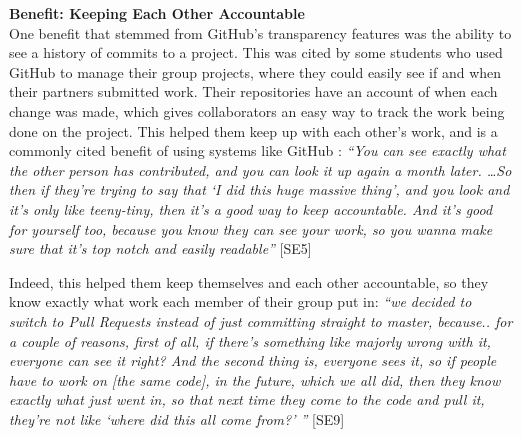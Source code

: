 


\textbf{Benefit: Keeping Each Other Accountable} \\
One benefit that stemmed from GitHub's transparency features was the ability to see a history of commits to a project. This was cited by some students who used GitHub to manage their group projects, where they could easily see if and when their partners submitted work. Their repositories have an account of when each change was made, which gives collaborators an easy way to track the work being done on the project. This helped them keep up with each other's work, and is a commonly cited benefit of using systems like GitHub \cite{dabbish2012social}: \textit{``You can see exactly what the other person has contributed, and you can look it up again a month later. \ldots So then if they're trying to say that `I did this huge massive thing', and you look and it's only like teeny-tiny, then it's a good way to keep accountable. And it's good for yourself too, because you know they can see your work, so you wanna make sure that it's top notch and easily readable''} [SE5]


Indeed, this helped them keep themselves and each other accountable, so they know exactly what work each member of their group put in: \textit{``we decided to switch to Pull Requests instead of just committing straight to master, because.. for a couple of reasons, first of all, if there's something like majorly wrong with it, everyone can see it right? And the second thing is, everyone sees it, so if people have to work on [the same code], in the future, which we all did, then they know exactly what just went in, so that next time they come to the code and pull it, they're not like `where did this all come from?' ''} [SE9]

